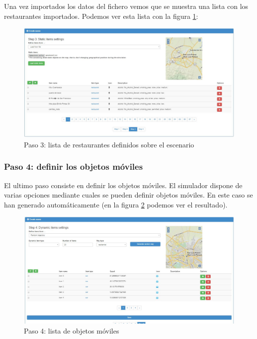 Una vez importados los datos del fichero vemos que se muestra una lista con los restaurantes importados. Podemos ver esta lista con la figura \ref{paso31definirLosRestaurantes}:

\begin{figure}[H]
	\centering\includegraphics[scale=0.4]{imagenes/explotacion/4.jpg}
	\caption{Paso 3: lista de restaurantes definidos sobre el escenario}
	\label{paso31definirLosRestaurantes}
\end{figure}

\subsubsection{Paso 4: definir los objetos móviles}

El ultimo paso consiste en definir los objetos móviles. El simulador dispone de varias opciones mediante cuales se pueden definir objetos móviles. En este caso se han generado automáticamente (en la figura \ref{paso4ListaObjetosMoviles} podemos ver el resultado).

\begin{figure}[H]
	\centering\includegraphics[scale=0.4]{imagenes/explotacion/5.jpg}
	\caption{Paso 4: lista de objetos móviles}
	\label{paso4ListaObjetosMoviles}
\end{figure}

